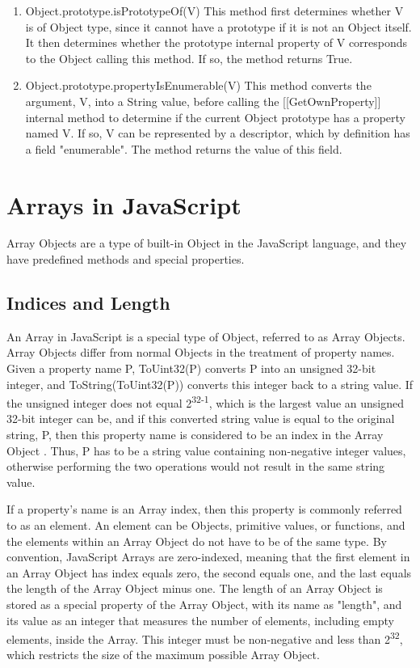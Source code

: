 \documentclass[a4paper,11pt,twoside]{report}
\begin{document}
\begin{enumerate}
\item Object.prototype.isPrototypeOf(V) \newline
This method first determines whether V is of Object type, since it cannot have a prototype if it is not an Object itself. It then determines whether the prototype internal property of V corresponds to the Object calling this method. If so, the method returns True.

\item Object.prototype.propertyIsEnumerable(V) \newline
This method converts the argument, V, into a String value, before calling the [[GetOwnProperty]] internal method to determine if the current Object prototype has a property named V. If so, V can be represented by a descriptor, which by definition has a field "enumerable". The method returns the value of this field.
\end{enumerate}

\chapter{Arrays in JavaScript}
Array Objects are a type of built-in Object in the JavaScript language, and they have predefined methods and special properties. 

\section{Indices and Length}
An Array in JavaScript is a special type of Object, referred to as Array Objects. Array Objects differ from normal Objects in the treatment of property names. Given a property name P, ToUint32(P) converts P into an unsigned 32-bit integer, and ToString(ToUint32(P)) converts this integer back to a string value. If the unsigned integer does not equal 2\textsuperscript{32-1}, which is the largest value an unsigned 32-bit integer can be, and if this converted string value is equal to the original string, P, then this property name is considered to be an index in the Array Object \cite{EcmaScript}. Thus, P has to be a string value containing non-negative integer values, otherwise performing the two operations would not result in the same string value. 

If a property's name is an Array index, then this property is commonly referred to as an element. An element can be Objects, primitive values, or functions, and the elements within an Array Object do not have to be of the same type. By convention, JavaScript Arrays are zero-indexed, meaning that the first element in an Array Object has index equals zero, the second equals one, and the last equals the length of the Array Object minus one. The length of an Array Object is stored as a special property of the Array Object, with its name as "length", and its value as an integer that measures the number of elements, including empty elements, inside the Array. This integer must be non-negative and less than 2\textsuperscript{32}, which restricts the size of the maximum possible Array Object. 
\end{document}
